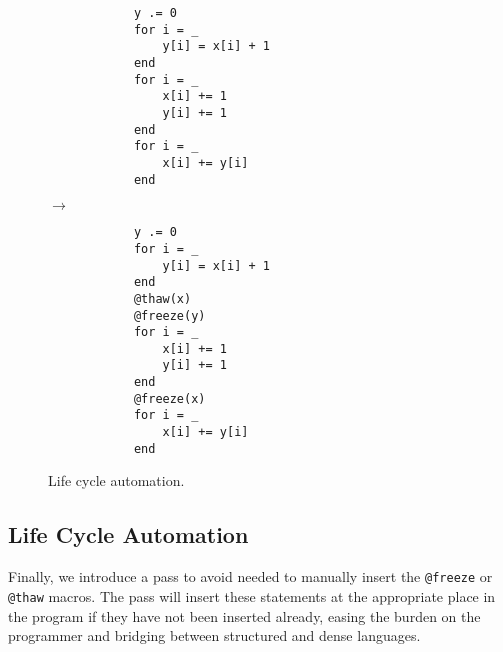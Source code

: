     \begin{wrapfigure}{R}{0.34\textwidth}
        \vspace{-12pt}
        \begin{minipage}{0.15\textwidth}
        \begin{verbatim}
            y .= 0
            for i = _
                y[i] = x[i] + 1
            end
            for i = _
                x[i] += 1
                y[i] += 1
            end 
            for i = _
                x[i] += y[i]
            end
        \end{verbatim}
        \end{minipage}
        $\rightarrow$
        \begin{minipage}{0.15\textwidth}
        \begin{verbatim}
            y .= 0
            for i = _
                y[i] = x[i] + 1
            end
            @thaw(x)
            @freeze(y)
            for i = _
                x[i] += 1
                y[i] += 1
            end
            @freeze(x)
            for i = _
                x[i] += y[i]
            end
        \end{verbatim}
        \end{minipage}

        \vspace{-8pt}
        \caption{Life cycle automation.} \label{fig:lifecycles}
        \vspace{-18pt}
    \end{wrapfigure}
\subsection{Life Cycle Automation}
Finally, we introduce a pass to avoid needed to manually insert the \texttt{@freeze} or \texttt{@thaw} macros.
%
The pass will insert these statements at the appropriate place in the program if they have not been inserted already, easing the burden on the programmer and bridging between structured and dense languages.
